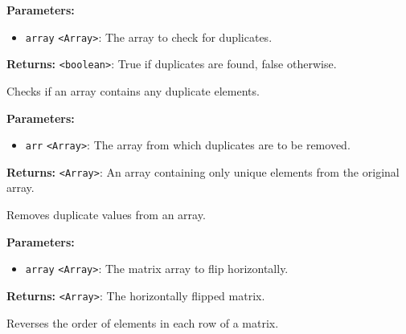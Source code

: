 \documentclass[12pt,a4paper]{article}
\begin{document}
\vspace{5mm}
\noindent {}


\noindent \textbf{Parameters:}
\begin{itemize}
  \item \texttt{array} \texttt{<Array>}: The array to check for duplicates.
\end{itemize}

\noindent \textbf{Returns:} \texttt{<boolean>}: True if duplicates are found, false otherwise.

\noindent Checks if an array contains any duplicate elements.

\vspace{5mm}
\noindent {}


\noindent \textbf{Parameters:}
\begin{itemize}
  \item \texttt{arr} \texttt{<Array>}: The array from which duplicates are to be removed.
\end{itemize}

\noindent \textbf{Returns:} \texttt{<Array>}: An array containing only unique elements from the original array.

\noindent Removes duplicate values from an array.

\vspace{5mm}
\noindent {}


\noindent \textbf{Parameters:}
\begin{itemize}
  \item \texttt{array} \texttt{<Array>}: The matrix array to flip horizontally.
\end{itemize}

\noindent \textbf{Returns:} \texttt{<Array>}: The horizontally flipped matrix.

\noindent Reverses the order of elements in each row of a matrix.

\vspace{5mm}
\noindent {}
\end{document}
